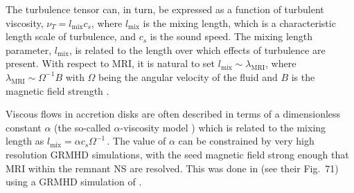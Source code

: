 The turbulence tensor can, in turn, be expressed as a function of 
turbulent viscosity, $\nu_T = l_{\text{mix}}c_s$, where $l_{\text{mix}}$
is the mixing length, which is a characteristic length scale of turbulence, and 
$c_s$ is the sound speed.
%
%
%
%
%
The mixing length parameter, $l_{\text{mix}}$, is related to the length 
over which effects of turbulence are present. 
%
%
%
%
%
%
With respect to \ac{MRI}, it is natural to set 
$l_{\text{mix}} \sim \lambda_{\text{MRI}}$, where 
$\lambda_{\text{MRI}} \sim \Omega^{-1}B$ with $\Omega$ 
being the angular velocity of the fluid and $B$ is the magnetic
field strength \citep{Duez:2006qe}.

Viscous flows in accretion disks are often described in terms of a dimensionless 
constant $\alpha$ (the so-called $\alpha$-viscosity model \citep{Shakura:1972te}) which is related to the 
mixing length as 
%
$ l_{\text{mix}} = \alpha c_s \Omega^{-1}\, . $ 
%
%
The value of $\alpha$ can be constrained by very high resolution 
\ac{GRMHD} simulations, with the seed magnetic field 
strong enough that \ac{MRI} within the remnant \ac{NS} are resolved. 
This was done in \citet{Radice:2020ids} (see their Fig.~71) 
using a \ac{GRMHD} simulation of \citet{Kiuchi:2017zzg}.


